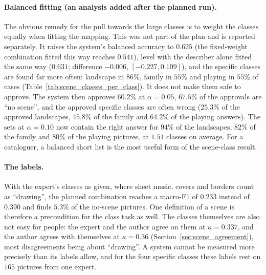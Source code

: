 \paragraph{Balanced fitting (an analysis added after the planned run).} The obvious remedy for the pull towards the large classes is to weight the classes equally when fitting the mapping. This was not part of the plan and is reported separately. It raises the system's balanced accuracy to $0.625$ (the fixed-weight combination fitted this way reaches $0.541$), level with the describer alone fitted the same way ($0.631$; difference $-0.006$, $[-0.227, 0.109]$), and the specific classes are found far more often: landscape in $86\%$, family in $55\%$ and playing in $55\%$ of cases (Table~\ref{tab:scene_classes_per_class}). It does not make them safe to approve. The system then approves $60.2\%$ at $\alpha=0.05$, $67.5\%$ of the approvals are ``no scene'', and the approved specific classes are often wrong ($25.3\%$ of the approved landscapes, $45.8\%$ of the family and $64.2\%$ of the playing answers). The sets at $\alpha=0.10$ now contain the right answer for $94\%$ of the landscapes, $82\%$ of the family and $80\%$ of the playing pictures, at $1.51$ classes on average. For a cataloguer, a balanced short list is the most useful form of the scene-class result.

\paragraph{The labels.} With the expert's classes as given, where sheet music, covers and borders count as ``drawing'', the planned combination reaches a macro-F1 of $0.233$ instead of $0.390$ and finds $5.3\%$ of the no-scene pictures. One definition of a scene is therefore a precondition for the class task as well. The classes themselves are also not easy for people: the expert and the author agree on them at $\kappa = 0.337$, and the author agrees with themselves at $\kappa = 0.36$ (Section~\ref{sec:scene_agreement}), most disagreements being about ``drawing''. A system cannot be measured more precisely than its labels allow, and for the four specific classes these labels rest on $165$ pictures from one expert.

